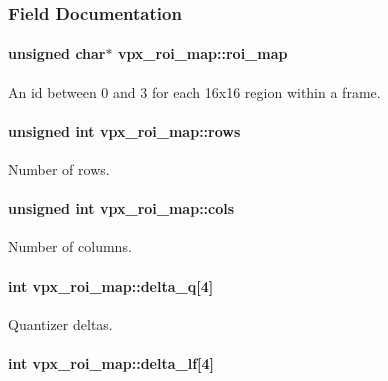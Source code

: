 \subsubsection{Field Documentation}
\hypertarget{structvpx__roi__map_aba69e211b81d622977ba07ac47b61075}{
\paragraph[{roi\+\_\+map}]{\setlength{\rightskip}{0pt plus 5cm}unsigned char$\ast$ vpx\+\_\+roi\+\_\+map\+::roi\+\_\+map}}\label{structvpx__roi__map_aba69e211b81d622977ba07ac47b61075}
An id between 0 and 3 for each 16x16 region within a frame. \hypertarget{structvpx__roi__map_a3fdcecd472553d08a99ced02cda5c9a6}{
\paragraph[{rows}]{\setlength{\rightskip}{0pt plus 5cm}unsigned int vpx\+\_\+roi\+\_\+map\+::rows}}\label{structvpx__roi__map_a3fdcecd472553d08a99ced02cda5c9a6}
Number of rows. \hypertarget{structvpx__roi__map_a5458459aaf16b14b86fb0adef32757c8}{
\paragraph[{cols}]{\setlength{\rightskip}{0pt plus 5cm}unsigned int vpx\+\_\+roi\+\_\+map\+::cols}}\label{structvpx__roi__map_a5458459aaf16b14b86fb0adef32757c8}
Number of columns. \hypertarget{structvpx__roi__map_a6e7aecf1d31c329f43dcb36717b3999b}{
\paragraph[{delta\+\_\+q}]{\setlength{\rightskip}{0pt plus 5cm}int vpx\+\_\+roi\+\_\+map\+::delta\+\_\+q\mbox{[}4\mbox{]}}}\label{structvpx__roi__map_a6e7aecf1d31c329f43dcb36717b3999b}
Quantizer deltas. \hypertarget{structvpx__roi__map_a5164be48a612bf872b81e0a86726fbed}{
\paragraph[{delta\+\_\+lf}]{\setlength{\rightskip}{0pt plus 5cm}int vpx\+\_\+roi\+\_\+map\+::delta\+\_\+lf\mbox{[}4\mbox{]}}}\label{structvpx__roi__map_a5164be48a612bf872b81e0a86726fbed}
